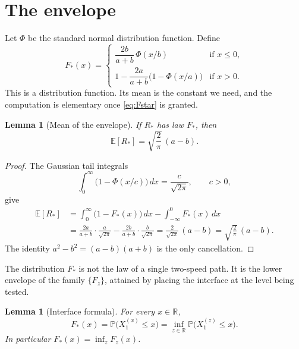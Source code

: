 \documentclass[11pt]{article}
\newtheorem{lemma}[theorem]{Lemma}
\theoremstyle{definition}
\newcommand{\E}{\mathbb{E}}
\newcommand{\Prob}{\mathbb{P}}
\newcommand{\R}{\mathbb{R}}
\begin{document}
\section{The envelope}
\label{sec:envelope}

Let \(\Phi\) be the standard normal distribution function.
Define
\begin{equation}
  \label{eq:Fstar}
  F_*(x)=
  \begin{cases}
    \dfrac{2b}{a+b}\,\Phi(x/b) & \text{if }x\le 0,\\[1.2ex]
    1-\dfrac{2a}{a+b}\bigl(1-\Phi(x/a)\bigr) & \text{if }x>0.
  \end{cases}
\end{equation}
This is a distribution function.
Its mean is the constant we need, and the computation is elementary once \eqref{eq:Fstar} is granted.

\begin{lemma}[Mean of the envelope]
\label{lem:mean}
If \(R_*\) has law \(F_*\), then
\[
  \E[R_*]=\sqrt{\frac{2}{\pi}}\,(a-b).
\]
\end{lemma}

\begin{proof}
The Gaussian tail integrals
\[
  \int_0^\infty\bigl(1-\Phi(x/c)\bigr)\,dx=\frac{c}{\sqrt{2\pi}},
  \qquad c>0,
\]
give
\begin{align*}
  \E[R_*]
  &=
  \int_0^\infty\bigl(1-F_*(x)\bigr)\,dx
  -\int_{-\infty}^0 F_*(x)\,dx\\
  &=
  \frac{2a}{a+b}\cdot\frac{a}{\sqrt{2\pi}}
  -\frac{2b}{a+b}\cdot\frac{b}{\sqrt{2\pi}}
  =
  \frac{2}{\sqrt{2\pi}}\,(a-b)
  =
  \sqrt{\frac{2}{\pi}}\,(a-b).
\end{align*}
The identity \(a^2-b^2=(a-b)(a+b)\) is the only cancellation.
\end{proof}

The distribution \(F_*\) is not the law of a single two-speed path.
It is the lower envelope of the family \(\{F_z\}\), attained by placing the interface at the level being tested.

\begin{lemma}[Interface formula]
\label{lem:interface}
For every \(x\in\R\),
\[
  F_*(x)=\Prob\bigl(X^{(x)}_1\le x\bigr)
  =\inf_{z\in\R}\Prob\bigl(X^{(z)}_1\le x\bigr).
\]
In particular \(F_*(x)=\inf_z F_z(x)\).
\end{lemma}
\end{document}
